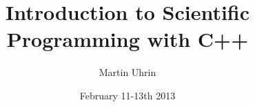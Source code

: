 \newcommand{\warnblock}[1]{%
  \begin{warnblocke}#1\end{warnblocke}
} %

\newcommand{\cout}[1]{%
 Output: \pbox[t]{\textwidth}{\ttfamily\fontsize{9}{10}\selectfont{}#1}
}

\newenvironment{doitemize}[0]{%
  \begin{itemize}}%
  {\end{itemize}} %




\title{Introduction to Scientific Programming with C++}
\author{Martin Uhrin}
\date{February 11-13th 2013}